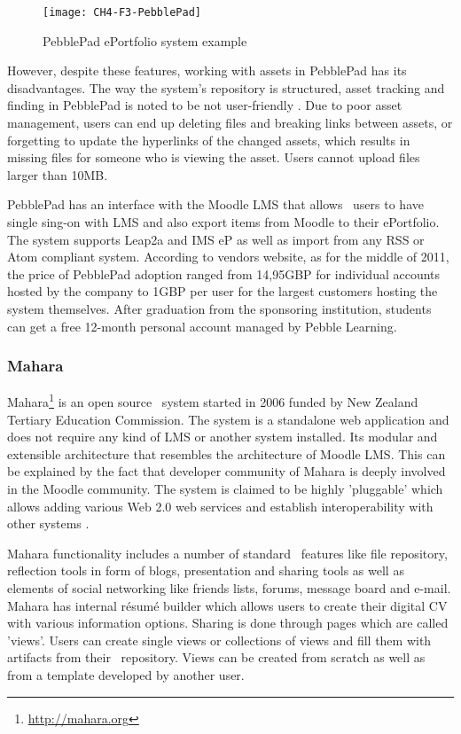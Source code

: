 \begin{figure}[htb]
\centering
\texttt{[image: CH4-F3-PebblePad]}
\caption[PebblePad ePortfolio system example]{PebblePad ePortfolio system example
\citep{PebbleLearningLtd}}
\label{fig:ppep}
\end{figure}

However, despite these features, working with assets in PebblePad has its
disadvantages. The way the system's repository is structured, asset tracking and
finding in PebblePad is noted to be not user-friendly \citep{Overton2009}. Due
to poor asset management, users can end up deleting files and breaking links
between assets, or forgetting to update the hyperlinks of the changed assets,
which results in missing files for someone who is viewing the asset. Users
cannot upload files larger than 10MB.

PebblePad has an interface with the Moodle LMS that allows \ep~users to have
single sing-on with LMS and also export items from Moodle to their ePortfolio.
The system supports Leap2a and IMS eP as well as import from any RSS or Atom
compliant system. According to vendors website, as for the middle of 2011,
the price of PebblePad adoption ranged from 14,95GBP for individual accounts
hosted by the company to 1GBP per user for the largest customers hosting
the system themselves. After graduation from the sponsoring institution,
students can get a free 12-month personal account managed by Pebble Learning.
 
\subsubsection{Mahara}
Mahara\footnote{\url{http://mahara.org}} is an open source \ep~system started in
2006 funded by New Zealand Tertiary Education Commission. The system is a
standalone web application and does not require any kind of LMS or another
system installed. Its modular and extensible architecture that resembles the
architecture of Moodle LMS. This can be explained by the fact that developer
community of Mahara is deeply involved in the Moodle community. The system is
claimed to be highly 'pluggable' which allows adding various Web 2.0 web
services and establish interoperability with other systems
\citep{MaharaGovernanceGroup2011}.

Mahara functionality includes a number of standard \ep~features like file
repository, reflection tools in form of blogs, presentation and sharing tools as
well as elements of social networking like friends lists, forums, message board
and e-mail. Mahara has internal r\'{e}sum\'{e} builder which allows users to
create their digital CV with various information options. Sharing is done
through pages which are called 'views'. Users can create single views or
collections of views and fill them with artifacts from their \ep~repository.
Views can be created from scratch as well as from a template developed by
another user.

